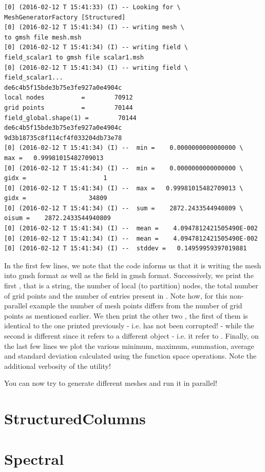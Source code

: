 \begin{lstlisting}[style=BashStyle]
[0] (2016-02-12 T 15:41:33) (I) -- Looking for \ 
MeshGeneratorFactory [Structured]
[0] (2016-02-12 T 15:41:34) (I) -- writing mesh \ 
to gmsh file mesh.msh
[0] (2016-02-12 T 15:41:34) (I) -- writing field \ 
field_scalar1 to gmsh file scalar1.msh
[0] (2016-02-12 T 15:41:34) (I) -- writing field \
field_scalar1...
de6c4b5f15bde3b75e3fe927a0e4904c
local nodes          =        70912
grid points          =        70144
field_global.shape(1) =        70144
de6c4b5f15bde3b75e3fe927a0e4904c
9d3b18735c8f114cf4f033204db73e78
[0] (2016-02-12 T 15:41:34) (I) --  min =    0.0000000000000000 \      
max =   0.99981015482709013
[0] (2016-02-12 T 15:41:34) (I) --  min =    0.0000000000000000 \ 
gidx =                     1
[0] (2016-02-12 T 15:41:34) (I) --  max =   0.99981015482709013 \
gidx =                 34809
[0] (2016-02-12 T 15:41:34) (I) --  sum =    2872.2433544940809 \      
oisum =    2872.2433544940809
[0] (2016-02-12 T 15:41:34) (I) --  mean =    4.0947812421505490E-002
[0] (2016-02-12 T 15:41:34) (I) --  mean =    4.0947812421505490E-002
[0] (2016-02-12 T 15:41:34) (I) --  stddev =   0.14959959397019881

\end{lstlisting}
%
In the first few lines, we note that the code informs us that it is 
writing the mesh into gmsh format as well as the field in gmsh format.
Successively, we print the first , that is a string, 
the number of local (to partition) nodes, the total number of grid 
points and the number of entries present in \inltf{field\_global}. 
Note how, for this non-parallel example the number of mesh points 
differs from the number of grid points as mentioned earlier. We 
then print the other two \inltf{checksum}, the first of them is 
identical to the one printed previously - i.e. \inltf{field\_scalar1} 
has not been corrupted! - while the second is different since it 
refers to a different object - i.e. it refer to .
Finally, on the last few lines we plot the various minimum, maximum, 
summation, average and standard deviation calculated using the 
function space operations.
Note the additional verbosity of the \inltf{atlas\_log} \Atlas utility!

You can now try to generate different meshes and run it in parallel!


\section{StructuredColumns}
\section{Spectral}

